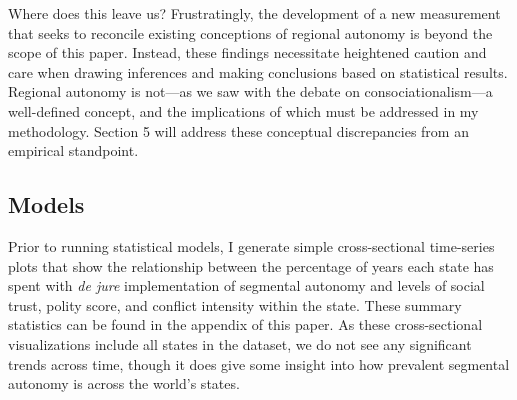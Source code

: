 \documentclass[12pt]{article}
\begin{document}
Where does this leave us? Frustratingly, the development of a new measurement that seeks to reconcile existing conceptions of regional autonomy is beyond the scope of this paper. Instead, these findings necessitate heightened caution and care when drawing inferences and making conclusions based on statistical results. Regional autonomy is not---as we saw with the debate on consociationalism---a well-defined concept, and the implications of which must be addressed in my methodology. Section 5 will address these conceptual discrepancies from an empirical standpoint. 

\begin{table}[ht]
	\centering
	\setlength{\tabcolsep}{4pt}
	\renewcommand{\arraystretch}{1.5} 
	\caption{Pearson's Correlation of Segmental Autonomy and Authority Measurements}
\end{table}

\subsection{Models}
Prior to running statistical models, I generate simple cross-sectional time-series plots that show the relationship between the percentage of years each state has spent with \textit{de jure} implementation of segmental autonomy and levels of social trust, polity score, and conflict intensity within the state. These summary statistics can be found in the appendix of this paper. As these cross-sectional visualizations include all states in the dataset, we do not see any significant trends across time, though it does give some insight into how prevalent segmental autonomy is across the world's states. 
\end{document}
